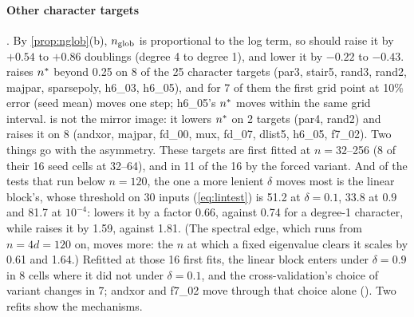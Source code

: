 \paragraph{Other character targets} . By \cref{prop:nglob}(b), $n_{\rm glob}$ is proportional to the log term, so  should raise it by $+0.54$ to $+0.86$ doublings (degree 4 to degree 1), and  lower it by $-0.22$ to $-0.43$.  raises $n^{*}$ beyond 0.25 on 8 of the 25 character targets (par3, stair5, rand3, rand2, majpar, sparsepoly, h6\_03, h6\_05), and for 7 of them the first grid point at 10\% error (seed mean) moves one step; h6\_05's $n^{*}$ moves within the same grid interval.  is not the mirror image: it lowers $n^{*}$ on 2 targets (par4, rand2) and raises it on 8 (andxor, majpar, fd\_00, mux, fd\_07, dlist5, h6\_05, f7\_02). Two things go with the asymmetry. These targets are first fitted at $n=32$--256 (8 of their 16 seed cells at 32--64), and in 11 of the 16 by the forced variant. And of the tests that run below $n=120$, the one a more lenient $\delta$ moves most is the linear block's, whose threshold on 30 inputs (\cref{eq:lintest}) is 51.2 at $\delta=0.1$, 33.8 at $0.9$ and 81.7 at $10^{-4}$:  lowers it by a factor 0.66, against 0.74 for a degree-1 character, while  raises it by 1.59, against 1.81. (The spectral edge, which runs from $n=4d=120$ on, moves more: the $n$ at which a fixed eigenvalue clears it scales by 0.61 and 1.64.) Refitted at those 16 first fits, the linear block enters under $\delta=0.9$ in 8 cells where it did not under $\delta=0.1$, and the cross-validation's choice of variant changes in 7; andxor and f7\_02 move through that choice alone (). Two refits show the mechanisms.
